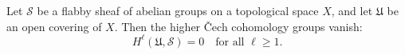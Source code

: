 Let $\mathcal{S}$ be a flabby sheaf of abelian groups on a topological space $X$, and let $\mathfrak{U}$ be an open covering of $X$. Then the higher Čech cohomology groups vanish:
$$H^{\ell}(\mathfrak{U}, \mathcal{S}) = 0 \quad \text{for all } \ell \geqslant 1.$$
